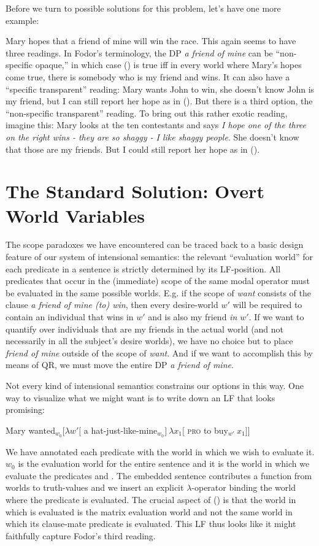 Before we turn to possible solutions for this problem, let's have one
more example:

\ex Mary hopes that a friend of mine will win the race. \xe
%
This again seems to have three readings. In Fodor's terminology, the DP \emph{a
  friend of mine} can be ``non-specific opaque,'' in which case (\lastx) is true
iff in every world where Mary's hopes come true, there is somebody who is my
friend and wins. It can also have a ``specific transparent'' reading: Mary wants
John to win, she doesn't know John is my friend, but I can still report her hope
as in (\lastx). But there is a third option, the ``non-specific transparent''
reading. To bring out this rather exotic reading, imagine this: Mary looks at
the ten contestants and says \emph{I hope one of the three on the right wins -
  they are so shaggy - I like shaggy people}. She doesn't know that those are my
friends. But I could still report her hope as in (\lastx).

\section{The Standard Solution: Overt World Variables}

The scope paradoxes we have encountered can be traced back to a basic design
feature of our system of intensional semantics: the relevant ``evaluation
world'' for each predicate in a sentence is strictly determined by its
LF-position. All predicates that occur in the (immediate) scope of the same
modal operator must be evaluated in the same possible worlds. E.g. if the scope
of \emph{want} consists of the clause \emph{a friend of mine (to) win}, then
every desire-world $w'$ will be required to contain an individual that wins in
$w'$ and is also my friend \emph{in $w'$}. If we want to quantify over
individuals that are my friends in the actual world (and not necessarily in all
the subject's desire worlds), we have no choice but to place \emph{friend of
  mine} outside of the scope of \emph{want}. And if we want to accomplish this
by means of QR, we must move the entire DP \emph{a friend of mine}.

Not every kind of intensional semantics constrains our options in this way. One
way to visualize what we might want is to write down an LF that looks promising:

\ex Mary wanted$_{w_0} [ \lambda w' [$ a
hat-just-like-mine$_{w_0}]\ \lambda x_1 [$ \textsc{pro} to buy$_{w'} \ x_{1} ]]$
\xe

We have annotated each predicate with the world in which we wish to evaluate it.
$w_0$ is the evaluation world for the entire sentence and it is the world in
which we evaluate the predicates  and
. The embedded sentence contributes a function
from worlds to truth-values and we insert an explicit $\lambda$-operator binding
the world where the predicate  is evaluated. The crucial aspect
of (\lastx) is that the world in which  is
evaluated is the matrix evaluation world and not the same world in which its
clause-mate predicate  is evaluated. This LF thus looks like it
might faithfully capture Fodor's third reading.


